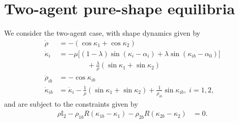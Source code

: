 \section{Two-agent pure-shape equilibria}
We consider the two-agent case, with shape dynamics given by
\begin{align}
\label{CL_dynamics_2_simplified}
\dot{\rho}
&= 
- (\cos\kappa_1 + \cos\kappa_2)
\nonumber \\
\dot{\kappa}_i 
&= 
- \mu \Big[(1 - \lambda)\sin(\kappa_i - \alpha_i) + \lambda \sin(\kappa_{ib} - \alpha_0) \Big] \nonumber \\
&\qquad  \qquad + \frac{\lambda}{\rho}(\sin\kappa_1 + \sin\kappa_2)
\\
\dot{\rho}_{ib} 
&= 
- \cos\kappa_{ib}
\nonumber \\
\dot{\kappa}_{ib} 
&= 
\dot{\kappa}_i
- \frac{1}{\rho}(\sin\kappa_1 + \sin\kappa_2)
+ \frac{1}{\rho_{ib}} \sin\kappa_{ib},  \; i=1,2,
\nonumber
\end{align}
and are subject to the constraints given by
\begin{align}
\rho \mathbb{I}_2 - \rho_{1b} R(\kappa_{1b} - \kappa_1) - \rho_{2b} R(\kappa_{2b} - \kappa_{2}) &= 0. 
\label{2_agent_CoNsTrAiNt_simplified}
\end{align}
  
  